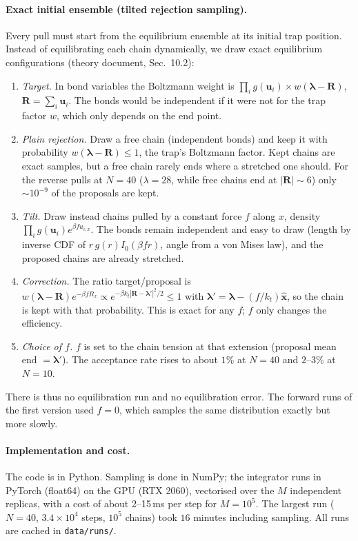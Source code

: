\documentclass[11pt,a4paper]{article}
\newcommand{\lam}{\bm{\lambda}}
\begin{document}
\paragraph{Exact initial ensemble (tilted rejection sampling).} Every pull must start from the
equilibrium ensemble at its initial trap position. Instead of equilibrating each chain dynamically,
we draw exact equilibrium configurations (theory document, Sec.~10.2):
\begin{enumerate}[leftmargin=*,itemsep=0pt]
\item \emph{Target.} In bond variables the Boltzmann weight is $\prod_ig(\bm u_i)\times w(\lam-\bm R)$,
$\bm R=\sum_i\bm u_i$. The bonds would be independent if it were not for the trap factor $w$, which only depends on the end point.
\item \emph{Plain rejection.} Draw a free chain (independent bonds) and keep it with probability
$w(\lam-\bm R)\le1$, the trap's Boltzmann factor. Kept chains are exact samples, but a free chain
rarely ends where a stretched one should. For the reverse pulls at $N=40$ ($\lambda=28$, while free chains end at
$|\bm R|\sim6$) only $\sim10^{-9}$ of the proposals are kept.
\item \emph{Tilt.} Draw instead chains pulled by a constant force $f$ along $x$, density
$\prod_ig(\bm u_i)e^{\beta fu_{i,x}}$. The bonds remain independent and easy to draw (length by inverse
CDF of $r\,g(r)I_0(\beta fr)$, angle from a von Mises law), and the proposed chains are already stretched.
\item \emph{Correction.} The ratio target/proposal is $w(\lam-\bm R)e^{-\beta fR_x}\propto e^{-\beta k_t|\bm R-\lam'|^2/2}\le1$ with
$\lam'=\lam-(f/k_t)\hat{\bm x}$, so the chain is kept with that probability. This is exact for any $f$;
$f$ only changes the efficiency.
\item \emph{Choice of $f$.} $f$ is set to the chain tension at that extension (proposal mean end
$=\lam'$). The acceptance rate rises to about $1\%$ at $N=40$ and $2$--$3\%$ at $N=10$.
\end{enumerate}
There is thus no equilibration run and no equilibration error. The forward runs of the first version used $f=0$, which
samples the same distribution exactly but more slowly.

\paragraph{Implementation and cost.} The code is in Python. Sampling is done in NumPy; the integrator runs in PyTorch (float64) on the
GPU (RTX 2060), vectorised over the $M$ independent replicas, with a cost of about 2--15\,ms per step for
$M=10^5$. The largest run ($N=40$, $3.4\times10^4$ steps, $10^5$ chains) took $16$ minutes including sampling. All runs are cached in
\texttt{data/runs/}.
\end{document}
